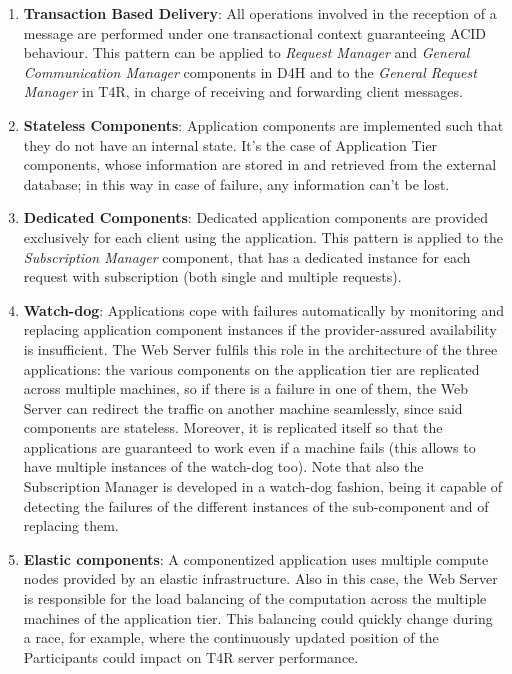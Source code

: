 \begin{enumerate}
    \item \textbf{Transaction Based Delivery}: All operations involved in the reception of a message are performed under one transactional context guaranteeing ACID behaviour. This pattern can be applied to \emph{Request Manager} and \emph{General Communication Manager} components in D4H and to the \emph{General Request Manager} in T4R, in charge of receiving and forwarding client messages.
    \item \textbf{Stateless Components}: Application components are implemented such that they do not have an internal state. It's the case of Application Tier components, whose information are stored in and retrieved from the external database; in this way in case of failure, any information can't be lost.
    \item \textbf{Dedicated Components}: Dedicated application components are provided exclusively for each client using the application. This pattern is applied to the \emph{Subscription Manager} component, that has a dedicated instance for each request with subscription (both single and multiple requests).
    \item \textbf{Watch-dog}: Applications cope with failures automatically by monitoring and replacing application component instances if the provider-assured availability is insufficient. The Web Server fulfils this role in the architecture of the three applications: the various components on the application tier are replicated across multiple machines, so if there is a failure in one of them, the Web Server can redirect the traffic on another machine seamlessly, since said components are stateless. Moreover, it is replicated itself so that the applications are guaranteed to work even if a machine fails (this allows to have multiple instances of the watch-dog too). Note that also the Subscription Manager is developed in a watch-dog fashion, being it capable of detecting the failures of the different instances of the sub-component and of replacing them.
    \item \textbf{Elastic components}: A componentized application uses multiple compute nodes provided by an elastic infrastructure. Also in this case, the Web Server is responsible for the load balancing of the computation across the multiple machines of the application tier. This balancing could quickly change during a race, for example, where the continuously updated position of the Participants could impact on T4R server performance.
\end{enumerate}